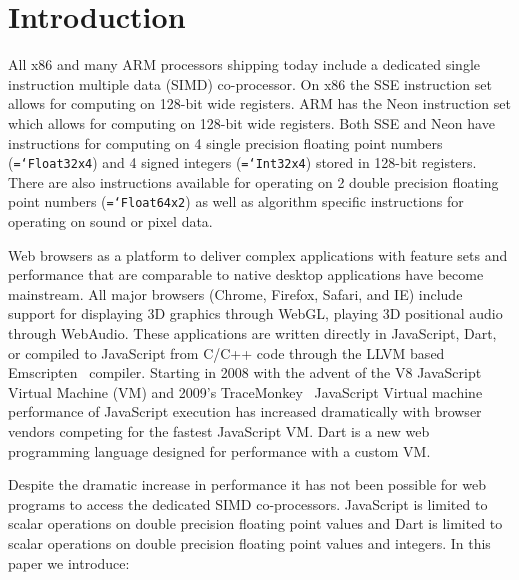 \documentclass{sigplanconf}
\newcommand{\ttt}[1]{{\texttt{\hyphenchar\font=`\-\relax #1}}}%
\begin{document}
\section{Introduction}

All x86 and many ARM processors shipping today include a dedicated single
instruction multiple data (SIMD) co-processor.  On x86 the SSE instruction set
allows for computing on 128-bit wide registers. ARM has the Neon instruction set
which allows for computing on 128-bit wide registers. Both SSE and Neon have
instructions for computing on 4 single precision floating point numbers
(\ttt{Float32x4}) and 4 signed integers (\ttt{Int32x4}) stored in 128-bit
registers. There are also instructions available for operating on 2 double
precision floating point numbers (\ttt{Float64x2}) as well as algorithm specific
instructions for operating on sound or pixel data.

Web browsers as a platform to deliver complex applications with feature sets and
performance that are comparable to native desktop applications have become
mainstream. All major browsers (Chrome, Firefox, Safari, and IE) include support
for displaying 3D graphics through WebGL, playing 3D positional audio through
WebAudio. These applications are written directly in JavaScript, Dart, or
compiled to JavaScript from C/C++ code through the LLVM based
Emscripten~\cite{emscripten} compiler. Starting in 2008 with the advent of the
V8 JavaScript Virtual Machine (VM) and 2009's TraceMonkey~\cite{tracemonkey}
JavaScript Virtual machine performance of JavaScript execution has
increased dramatically with browser vendors competing for the fastest JavaScript
VM. Dart is a new web programming language designed for performance with a
custom VM.

Despite the dramatic increase in performance it has not been possible for web
programs to access the dedicated SIMD co-processors. JavaScript is limited to
scalar operations on double precision floating point values and Dart is limited
to scalar operations on double precision floating point values and integers. In
this paper we introduce:
\end{document}
